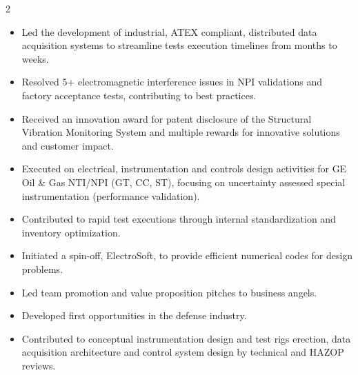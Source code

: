 \documentclass[9pt,a4paper,ragged2e,withhyper]{altacv} %
\begin{document}
\begin{paracol}{2}
\begin{itemize}
\item Led the development of industrial, ATEX compliant, distributed data acquisition systems to streamline tests execution timelines from months to weeks.
\item Resolved 5+ electromagnetic interference issues in NPI validations and factory acceptance tests, contributing to best practices.
\item Received an innovation award for patent disclosure of the Structural Vibration Monitoring System and multiple rewards for innovative solutions and customer impact.
\end{itemize}
\divider

\begin{itemize}
\item Executed on electrical, instrumentation and controls design activities for GE Oil \& Gas NTI/NPI (GT, CC, ST), focusing on uncertainty assessed special instrumentation (performance validation).
\item Contributed to rapid test executions through internal standardization and inventory optimization.
\end{itemize}
\divider

\begin{itemize}
\item Initiated a spin-off, ElectroSoft, to provide efficient numerical codes for design problems.
\item Led team promotion and value proposition pitches to business angels.
\item Developed first opportunities in the defense industry.
\end{itemize}



\begin{itemize}
\item Contributed to conceptual instrumentation design and test rigs erection, data acquisition architecture and control system design by technical and HAZOP reviews.
\end{itemize}
\divider


\end{paracol}
\end{document}
